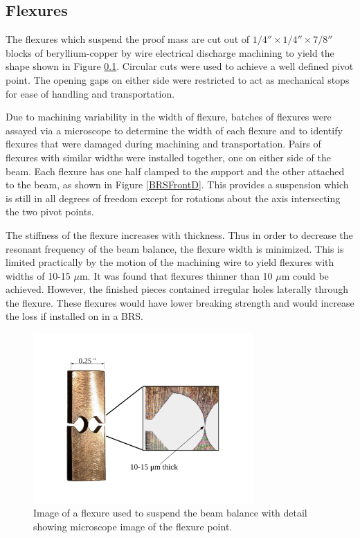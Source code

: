 \documentclass [12pt, proquest]{uwthesis}[2019]
\begin{document}
\subsection{Flexures}\label{flex}

The flexures which suspend the proof mass are cut out of $1/4''\times1/4''\times7/8''$ blocks of beryllium-copper by wire electrical discharge machining to yield the shape shown in Figure \ref{flex}. Circular cuts were used to achieve a well defined pivot point. The opening gaps on either side were restricted to act as mechanical stops for ease of handling and transportation.

Due to machining variability in the width of flexure, batches of flexures were assayed via a microscope to determine the width of each flexure and to identify flexures that were damaged during machining and transportation. Pairs of flexures with similar widths were installed together, one on either side of the beam. Each flexure has one half clamped to the support and the other attached to the beam, as shown in Figure \ref{BRSFrontD}. This provides a suspension which is still in all degrees of freedom except for rotations about the axis intersecting the two pivot points. 

The stiffness of the flexure increases with thickness. Thus in order to decrease the resonant frequency of the beam balance, the flexure width is minimized. This is limited practically by the motion of the machining wire to yield flexures with widths of 10-15 $\mu$m. It was found that flexures thinner than 10 $\mu$m could be achieved. However, the finished pieces contained irregular holes laterally through the flexure. These flexures would have lower breaking strength and would increase the loss if installed on in a BRS. 

\begin{figure}[!h]
\begin{center}
 \includegraphics[width=0.75\textwidth]{Flexure.pdf}
\caption[Image of a BRS flexure]{Image of a flexure used to suspend the beam balance with detail showing microscope image of the flexure point.}
\label{flexure}
\end{center}
\end{figure}
\end{document}
